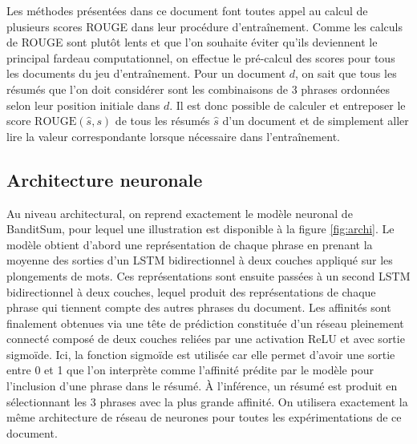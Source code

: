 Les méthodes présentées dans ce document font toutes
appel au calcul de plusieurs scores ROUGE dans leur procédure d'entraînement.
Comme les calculs de ROUGE sont plutôt lents et que l'on souhaite 
éviter qu'ils deviennent le principal fardeau computationnel, 
on effectue le pré-calcul des scores pour tous les documents du jeu 
d'entraînement.
Pour un document $d$, on sait que tous les résumés que l'on doit considérer sont 
les combinaisons de 3 phrases ordonnées selon leur position initiale dans $d$.
Il est donc possible de calculer et entreposer le score $\text{ROUGE}(\hat{s}, s)$ 
de tous les résumés $\hat{s}$ d'un document et de simplement aller lire la valeur 
correspondante lorsque nécessaire dans l'entraînement.

\subsection{Architecture neuronale}
\label{subsec:archi}

Au niveau architectural, on reprend exactement le modèle neuronal
de BanditSum, pour lequel une illustration est disponible à la 
figure \ref{fig:archi}.
Le modèle obtient d'abord une représentation de chaque phrase 
en prenant la moyenne des sorties d'un LSTM bidirectionnel 
à deux couches appliqué sur les plongements de mots.
Ces représentations sont ensuite passées à un second LSTM bidirectionnel
à deux couches, lequel produit des représentations de chaque phrase
qui tiennent compte des autres phrases du document.
Les affinités sont finalement obtenues via une tête de prédiction
constituée d'un réseau pleinement connecté
composé de deux couches reliées par une activation ReLU et avec sortie 
sigmoïde.
Ici, la fonction sigmoïde est utilisée car elle permet d'avoir une sortie 
entre 0 et 1 que l'on interprète comme l'affinité prédite par le modèle 
pour l'inclusion d'une phrase dans le résumé.
À l'inférence, un résumé est produit en sélectionnant les 
3 phrases avec la plus grande affinité.
On utilisera exactement la même architecture de réseau de neurones pour toutes
les expérimentations de ce document.

